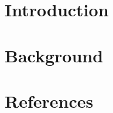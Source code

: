 \documentclass[times]{elsarticle}
\begin{document}



\section*{Introduction}



\section{Background}






\section*{References}


%



\end{document}
